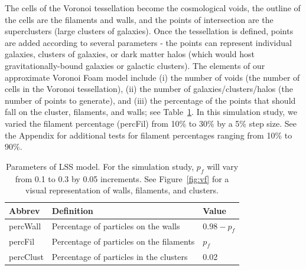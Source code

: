 \documentclass[12pt]{article}
\newcommand{\figref}[1]{Figure~\ref{#1}}
\begin{document}
The cells of the Voronoi tessellation become the cosmological voids, the outline of the cells are the filaments and walls, and the points of intersection are the superclusters (large clusters of galaxies).  Once the tessellation is defined, points are added according to several parameters - the points can represent individual galaxies, clusters of galaxies, or dark matter halos (which would host gravitationally-bound galaxies or galactic clusters).
The elements of our approximate Voronoi Foam model include (i) the number of voids (the number of cells in the Voronoi tessellation), (ii) the number of galaxies/clusters/halos (the number of points to generate), and (iii) the percentage of the points that should fall on the cluster, filaments, and walls; see Table~\ref{table:voronoisettings}. In this simulation study, we varied the filament percentage (percFil) from 10\% to 30\% by a 5\% step size. See the Appendix for additional tests for filament percentages ranging from 10\% to 90\%.

\begin{table}[htp!]
\begin{center}
\begin{tabular}{ l|l|l }
Abbrev & Definition & Value \\
\hline
percWall & Percentage of particles on the walls & $0.98 - p_{f}$ \\
percFil & Percentage of particles on the filaments & $p_{f}$ \\
percClust & Percentage of particles in the clusters & 0.02 \\
\end{tabular}
\end{center}
\caption{Parameters of LSS model. For the simulation study, $p_{f}$ will vary from 0.1 to 0.3 by 0.05 increments. See \figref{fig:vf} for a visual representation of walls, filaments, and clusters.}
\label{table:voronoisettings}
\end{table}
\end{document}
